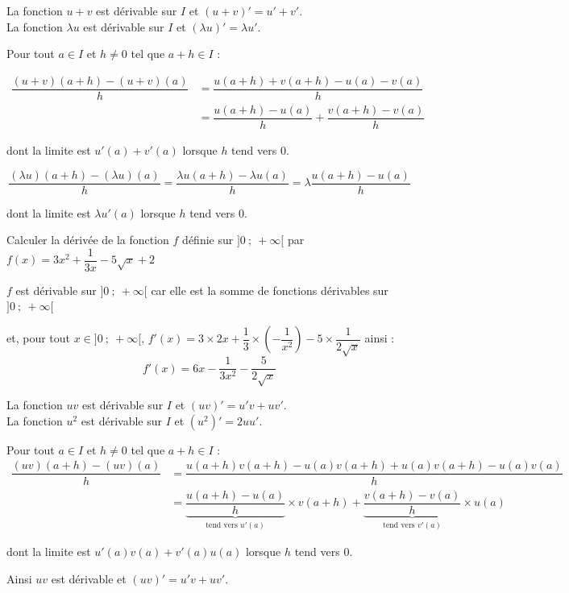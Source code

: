 \documentclass[french]{book}
\begin{document}
\begin{prop}
La fonction $u+v$ est dérivable sur $I$ et  $(u+v)'=u'+v'$.\\
La fonction $\lambda u$ est dérivable sur $I$ et  $(\lambda u)'=\lambda u'$.
\end{prop}

\begin{demo}
Pour tout $a\in I$ et $h\neq 0$ tel que $a+h\in I$ :

\begin{align*}
\dfrac{(u+v)(a+h)-(u+v)(a)}{h}&=\dfrac{u(a+h)+v(a+h)-u(a)-v(a)}{h}\\
&=\dfrac{u(a+h)-u(a)}{h}+\dfrac{v(a+h)-v(a)}{h}
\end{align*}

dont la limite est $u'(a)+v'(a)$ lorsque $h$ tend vers 0.

\[\dfrac{(\lambda u)(a+h)-(\lambda u)(a)}{h}=\dfrac{\lambda u(a+h)-\lambda u(a)}{h}=\lambda \dfrac{u(a+h)-u(a)}{h}\]

dont la limite est $\lambda u'(a)$ lorsque $h$ tend vers 0.
\end{demo}

\begin{exemple}
Calculer la dérivée de la fonction $f$ définie sur $]0~;~+\infty[$ par $f(x)=3x^{2}+\dfrac{1}{3x}-5\sqrt{x}+2$
\end{exemple}


$f$ est dérivable sur $]0~;~+\infty[$ car elle est la somme de fonctions dérivables sur $]0~;~+\infty[$

et, pour tout $x\in]0~;~+\infty[$, $f'(x)=3\times 2x+\dfrac{1}{3}\times \left(-\dfrac{1}{x^{2}}\right)-5\times \dfrac{1}{2\sqrt{x}}$ ainsi :
\[f'(x)=6x-\dfrac{1}{3x^{2}}-\dfrac{5}{2\sqrt{x}}\]


\vspace*{2ex}
\begin{prop}
La fonction $uv$ est dérivable sur $I$ et  $(uv)'=u'v+uv'$.\\
La fonction $u^{2}$ est dérivable sur $I$ et  $(u^{2})'=2uu'$.

\end{prop}

\begin{demo}
Pour tout $a\in I$ et $h\neq 0$ tel que $a+h\in I$ :
\begin{align*}
\dfrac{(uv)(a+h)-(uv)(a)}{h}&=\dfrac{u(a+h)v(a+h)-u(a)v(a+h)+u(a)v(a+h)-u(a)v(a)}{h}\\
&=\underbrace{\dfrac{u(a+h)-u(a)}{h}}_{\text{tend vers } u'(a)}\times v(a+h)+\underbrace{\dfrac{v(a+h)-v(a)}{h}}_{\text{tend vers } v'(a)}\times u(a)
\end{align*}

dont la limite est $u'(a)v(a)+v'(a)u(a)$ lorsque $h$ tend vers 0.

Ainsi $uv$ est dérivable et $(uv)'=u'v+uv'$.
\end{demo}
\end{document}
